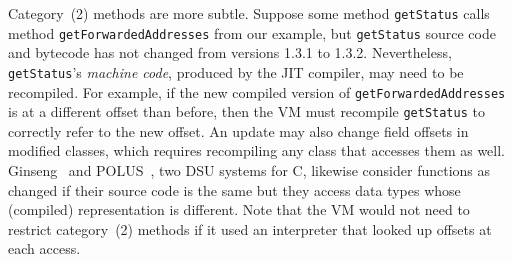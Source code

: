 \documentclass[9pt]{sigplanconf}
\newcommand{\DSU}{{\sc Jvolve}}
\begin{document}
Category~(2) methods are more subtle.  Suppose some method \texttt{getStatus}
calls method \texttt{getForwardedAddresses} from our example, but
\texttt{getStatus} 
source code and bytecode has not changed from versions 1.3.1 to 1.3.2.
Nevertheless, \texttt{getStatus}'s \emph{machine code}, produced by the
JIT compiler, may need to be recompiled.  For example, if the new
compiled version of {\tt getForwarded\-Addresses} is at a different offset 
than before, then the VM must recompile
\texttt{getStatus} to correctly refer to the new
offset.  An update may also change field offsets in modified classes,
which requires recompiling any class that accesses
them as well.  
Ginseng~\cite{neamtiu06dsu} and POLUS~\cite{chen:icse07}, two
DSU systems for C, likewise consider functions as changed if their
source code is the same but they
access data types whose (compiled) representation is different.
Note that the VM would not need to restrict category~(2) methods if it used an
interpreter that looked up offsets at each access.



\end{document}
